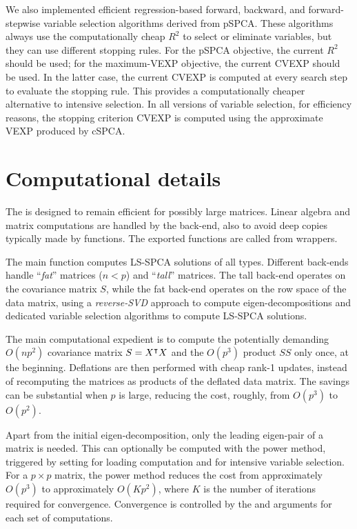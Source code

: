 \documentclass[article]{jss}
\begin{document}
We also implemented efficient regression-based forward, backward, and forward-stepwise variable selection algorithms derived from pSPCA. These algorithms always use the computationally cheap $R^2$ to select or eliminate variables, but they can use different stopping rules. For the pSPCA objective, the current $R^2$ should be used; for the maximum-VEXP objective, the current CVEXP should be used. In the latter case, the current CVEXP is computed at every search step to evaluate the stopping rule. This provides a computationally cheaper alternative to intensive selection. In all versions of variable selection, for efficiency reasons, the  stopping criterion CVEXP is computed using the approximate VEXP produced by cSPCA.

\section{Computational details}
The  is designed to remain efficient for possibly large matrices. Linear algebra and matrix computations are handled by the  back-end, also to avoid deep copies typically made by  functions. The exported  functions are called from  wrappers.

The main function  computes LS-SPCA solutions of all types. Different back-ends handle ``\emph{fat}'' matrices ($n < p$) and ``\emph{tall}'' matrices. The tall back-end operates on the covariance matrix $S$, while the fat back-end operates on the row space of the data matrix, using a \emph{reverse-SVD} approach to compute eigen-decompositions and dedicated variable selection algorithms to compute LS-SPCA solutions. 

The main computational expedient is to compute the potentially demanding $O(np^2)$ covariance matrix $S = X^{\scriptstyle{\intercal}} X$ and the $O(p^3)$ product $SS$ only once, at the beginning. Deflations are then performed with cheap rank-1 updates, instead of recomputing the matrices as products of the deflated data matrix. The savings can be substantial when $p$ is large, reducing the cost, roughly, from $O(p^3)$ to $O(p^2)$.

Apart from the initial eigen-decomposition, only the leading eigen-pair of a matrix is needed. This can optionally be computed with the power method, triggered by setting  for loading computation and  for intensive variable selection. For a $p \times p$ matrix, the power method reduces the cost from approximately $O(p^3)$ to approximately $O(Kp^2)$, where $K$ is the number of iterations required for convergence. Convergence is controlled by the  and  arguments for each set of computations.
\end{document}
